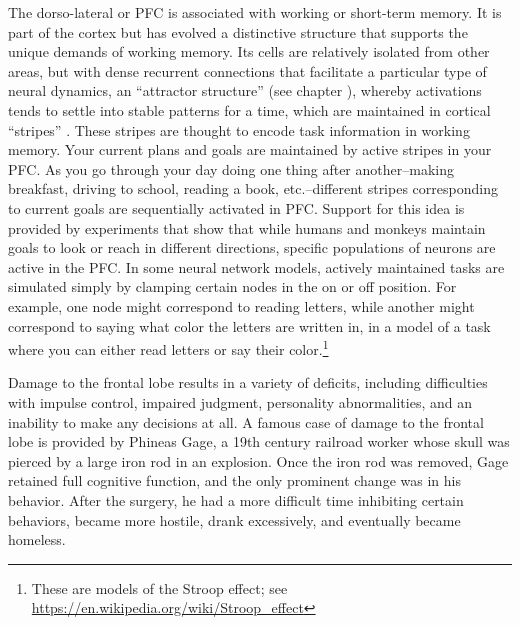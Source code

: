 The dorso-lateral  or PFC is associated with working or short-term memory. It is part of the cortex but has evolved a distinctive structure that supports the unique demands of working memory. Its cells are relatively isolated from other areas, but with dense recurrent connections that facilitate a particular type of neural dynamics, an ``attractor structure'' (see chapter ), whereby activations tends to settle into stable patterns for a time, which are maintained in cortical ``stripes'' \cite{kriete2013indirection}. These stripes are thought to encode task information in working memory. Your current plans and goals are maintained by active stripes in your PFC. As you go through your day doing one thing after another--making breakfast, driving to school, reading a book, etc.--different stripes corresponding to current goals are sequentially activated in PFC. Support for this idea is provided by experiments that show that while humans and monkeys maintain goals to look or reach in different directions, specific populations of neurons are active in the PFC. In some neural network models, actively maintained tasks are simulated simply by clamping certain nodes in the on or off position. For example, one node might correspond to reading letters, while another might correspond to saying what color the letters are written in, in a model of a task where you can either read letters or say their color.\footnote{These are models of the Stroop effect; see \url{https://en.wikipedia.org/wiki/Stroop_effect}}


 Damage to the frontal lobe results in a variety of deficits, including difficulties with impulse control, impaired judgment, personality abnormalities, and an inability to make any decisions at all. A famous case of damage to the frontal lobe is provided by Phineas Gage, a 19th century railroad worker whose skull was pierced by a large iron rod in an explosion. Once the iron rod was removed, Gage retained full cognitive function, and the only prominent change was in his behavior. After the surgery, he had a more difficult time inhibiting certain behaviors, became more hostile, drank excessively, and eventually became homeless.

